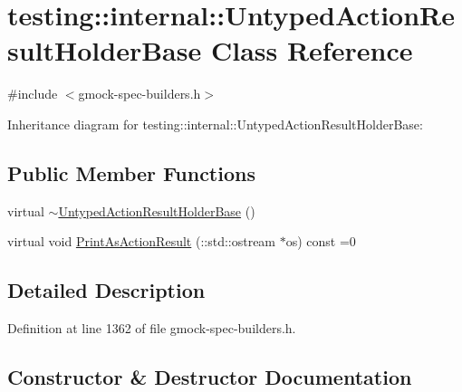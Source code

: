 \hypertarget{classtesting_1_1internal_1_1_untyped_action_result_holder_base}{}\section{testing\+:\+:internal\+:\+:Untyped\+Action\+Result\+Holder\+Base Class Reference}
\label{classtesting_1_1internal_1_1_untyped_action_result_holder_base}


{\ttfamily \#include $<$gmock-\/spec-\/builders.\+h$>$}



Inheritance diagram for testing\+:\+:internal\+:\+:Untyped\+Action\+Result\+Holder\+Base\+:
\subsection*{Public Member Functions}
\begin{DoxyCompactItemize}
\item 
virtual \hyperlink{classtesting_1_1internal_1_1_untyped_action_result_holder_base_a2e6c331d249aea75ccc1e4fba3897a29}{$\sim$\+Untyped\+Action\+Result\+Holder\+Base} ()
\item 
virtual void \hyperlink{classtesting_1_1internal_1_1_untyped_action_result_holder_base_a4b4a558fcb1d3b02c0fec34f186d3b90}{Print\+As\+Action\+Result} (\+::std\+::ostream $\ast$os) const =0
\end{DoxyCompactItemize}


\subsection{Detailed Description}


Definition at line 1362 of file gmock-\/spec-\/builders.\+h.



\subsection{Constructor \& Destructor Documentation}
